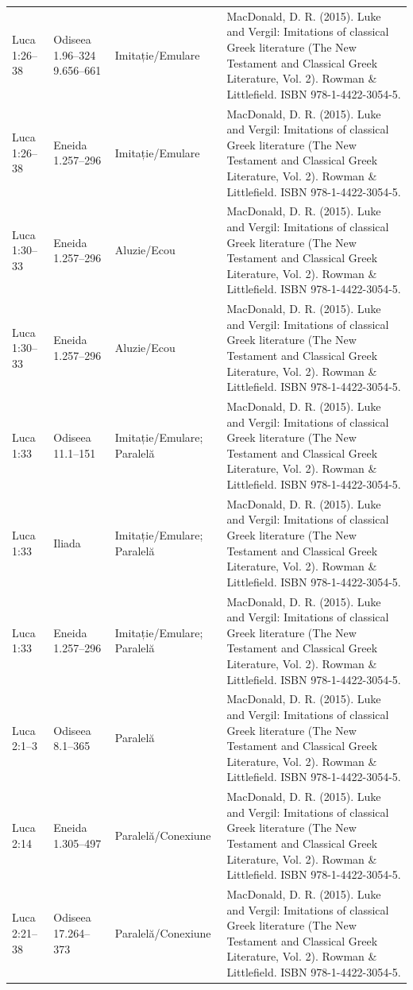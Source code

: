 \documentclass[12pt,a4paper,twoside,openany]{book}
\begin{document}
\begin{longtable}{L{1.4cm}L{1.7cm}L{3.1cm}L{8.4cm}}
Luca 1:26–38 & Odiseea 1.96–324 9.656–661 & Imitație/Emulare & MacDonald, D. R. (2015). Luke and Vergil: Imitations of classical Greek literature (The New Testament and Classical Greek Literature, Vol. 2). Rowman \& Littlefield. ISBN 978-1-4422-3054-5. \\
Luca 1:26–38 & Eneida 1.257–296 & Imitație/Emulare & MacDonald, D. R. (2015). Luke and Vergil: Imitations of classical Greek literature (The New Testament and Classical Greek Literature, Vol. 2). Rowman \& Littlefield. ISBN 978-1-4422-3054-5. \\
Luca 1:30–33 & Eneida 1.257–296 & Aluzie/Ecou & MacDonald, D. R. (2015). Luke and Vergil: Imitations of classical Greek literature (The New Testament and Classical Greek Literature, Vol. 2). Rowman \& Littlefield. ISBN 978-1-4422-3054-5. \\
Luca 1:30–33 & Eneida 1.257–296 & Aluzie/Ecou & MacDonald, D. R. (2015). Luke and Vergil: Imitations of classical Greek literature (The New Testament and Classical Greek Literature, Vol. 2). Rowman \& Littlefield. ISBN 978-1-4422-3054-5. \\
Luca 1:33 & Odiseea 11.1–151 & Imitație/Emulare; Paralelă & MacDonald, D. R. (2015). Luke and Vergil: Imitations of classical Greek literature (The New Testament and Classical Greek Literature, Vol. 2). Rowman \& Littlefield. ISBN 978-1-4422-3054-5. \\
Luca 1:33 & Iliada & Imitație/Emulare; Paralelă & MacDonald, D. R. (2015). Luke and Vergil: Imitations of classical Greek literature (The New Testament and Classical Greek Literature, Vol. 2). Rowman \& Littlefield. ISBN 978-1-4422-3054-5. \\
Luca 1:33 & Eneida 1.257–296 & Imitație/Emulare; Paralelă & MacDonald, D. R. (2015). Luke and Vergil: Imitations of classical Greek literature (The New Testament and Classical Greek Literature, Vol. 2). Rowman \& Littlefield. ISBN 978-1-4422-3054-5. \\
Luca 2:1–3 & Odiseea 8.1–365 & Paralelă & MacDonald, D. R. (2015). Luke and Vergil: Imitations of classical Greek literature (The New Testament and Classical Greek Literature, Vol. 2). Rowman \& Littlefield. ISBN 978-1-4422-3054-5. \\
Luca 2:14 & Eneida 1.305–497 & Paralelă/Conexiune & MacDonald, D. R. (2015). Luke and Vergil: Imitations of classical Greek literature (The New Testament and Classical Greek Literature, Vol. 2). Rowman \& Littlefield. ISBN 978-1-4422-3054-5. \\
Luca 2:21–38 & Odiseea 17.264–373 & Paralelă/Conexiune & MacDonald, D. R. (2015). Luke and Vergil: Imitations of classical Greek literature (The New Testament and Classical Greek Literature, Vol. 2). Rowman \& Littlefield. ISBN 978-1-4422-3054-5. \\

\end{longtable}
\end{document}
